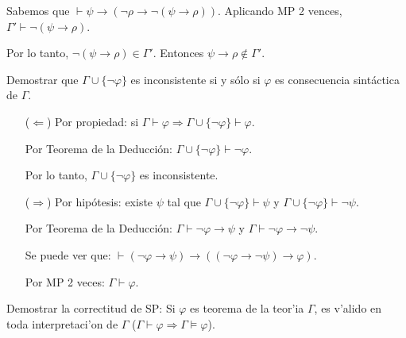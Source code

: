 \begin{questions}
\begin{solution}
\begin{enumerate}[\quad]
\begin{enumerate}
\begin{itemize}
     Sabemos que $\vdash\psi\rightarrow(\neg\rho\rightarrow\neg(\psi\rightarrow\rho))$. Aplicando MP 2 vences, $\Gamma'\vdash\neg(\psi\rightarrow\rho)$. 
     
     Por lo tanto, $\neg(\psi\rightarrow\rho)\in\Gamma'$. Entonces $\psi\rightarrow\rho\notin\Gamma'$.
     
    \end{itemize}

    
  \end{enumerate}


 \end{enumerate}

\end{solution}

\question Demostrar que $\Gamma \cup \{\neg\varphi\}$ es inconsistente si y s\'olo si $\varphi$ es consecuencia sint\'actica de $\Gamma$.


\begin{solution}
 
 \begin{itemize}
  \item[($\Leftarrow$)] Por propiedad: si $\Gamma\vdash\varphi \Rightarrow \Gamma\cup\{\neg\varphi\}\vdash\varphi$.
  
    Por Teorema de la Deducci\'on: $\Gamma\cup\{\neg\varphi\}\vdash\neg\varphi$.
    
    Por lo tanto, $\Gamma\cup\{\neg\varphi\}$ es inconsistente.
  \item[($\Rightarrow$)] Por hip\'otesis: existe $\psi$ tal que $\Gamma\cup\{\neg\varphi\}\vdash\psi$ y $\Gamma\cup\{\neg\varphi\}\vdash\neg\psi$. 
  
  Por Teorema de la Deducci\'on: $\Gamma\vdash\neg\varphi\rightarrow\psi$ y $\Gamma\vdash\neg\varphi\rightarrow\neg\psi$. 
  
  Se puede ver que: $\vdash(\neg\varphi\rightarrow\psi)\rightarrow((\neg\varphi\rightarrow\neg\psi)\rightarrow\varphi)$. 
  
  Por MP 2 veces: $\Gamma\vdash\varphi$.
 \end{itemize}

\end{solution}

\question Demostrar la correctitud de SP: Si $\varphi$ es teorema de la teor'ia $\Gamma$, es v'alido en toda interpretaci'on de $\Gamma$ ($\Gamma \vdash \varphi \Rightarrow \Gamma \vDash \varphi$). 

\begin{solution}


\end{solution}
\end{questions}
